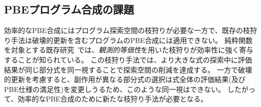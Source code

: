 \documentclass[11pt, a4paper, oneside, twocolumn]{jsarticle}
\newcommand{\mysys}{\textsc{RefSyn}}
\begin{document}


\subsection{PBEプログラム合成の課題}

効率的なPBE合成にはプログラム探索空間の枝狩りが必要な一方で、既存の枝狩り手法は破壊的更新を含むプログラムのPBE合成には適用できない。
純粋関数を対象とする既存研究~\cite{escher}では、\emph{観測的等価性}を用いた枝狩りが効率性に強く寄与することが知られている。
この枝狩り手法では、より大きな式の探索中に評価結果が同じ部分式を同一視することで探索空間の削減を達成する。
一方で破壊的更新を考慮すると、副作用が異なる部分式の選択は式全体の評価結果(及びPBE仕様の満足性)を変更しうるため、このような同一視はできない。
したがって、効率的なPBE合成のために新たな枝狩り手法が必要となる。

\end{document}
